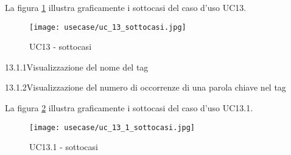 \vspace{10pt}
\par\noindent
\begin{minipage}{\textwidth}
    La figura \ref{fig:uc13_sottocasi} illustra graficamente i sottocasi del caso d'uso UC13.
    \begin{figure}[H]
        \centering
        \texttt{[image: usecase/uc\_13\_sottocasi.jpg]}
        \caption{UC13 - sottocasi}
        \label{fig:uc13_sottocasi}
    \end{figure}
\end{minipage}

\begin{usecase}{13.1.1}{Visualizzazione del nome del tag}\label{UC13point1point1}
\end{usecase}

\begin{usecase}{13.1.2}{Visualizzazione del numero di occorrenze di una parola chiave nel tag}\label{UC13point1point2}
\end{usecase}

\vspace{10pt}
\par\noindent
\begin{minipage}{\textwidth}
    La figura \ref{fig:uc13_1_sottocasi} illustra graficamente i sottocasi del caso d'uso UC13.1.
    \begin{figure}[H]
        \centering
        \texttt{[image: usecase/uc\_13\_1\_sottocasi.jpg]}
        \caption{UC13.1 - sottocasi}
        \label{fig:uc13_1_sottocasi}
    \end{figure}
\end{minipage}

